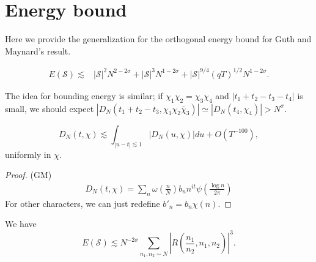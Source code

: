 
\section{Energy bound}
Here we provide the generalization for the orthogonal energy bound for Guth and Maynard's result. 
\begin{proposition}
    \begin{align*}
        E(\mathcal{S})
        \lesssim& |\mathcal{S}|^2N^{2-2\sigma}+ |\mathcal{S}|^3N^{1-2\sigma} + |\mathcal{S}|^{9/4}(qT)^{1/2}N^{{1-2\sigma}}.
    \end{align*}
\end{proposition}
The idea for bounding energy is similar; if $\chi_1\chi_2=\chi_3\chi_4$ and $|t_1+t_2-t_3-t_4|$ is small, we should expect $|D_N(t_1+t_2-t_3,\chi_1\chi_2\bar{\chi}_3)|\simeq |D_N(t_4,\chi_4)|>N^\sigma$.
\begin{lemma}
    \[
    D_N(t,\chi)\lesssim \int_{|u-t|\lesssim 1} |D_N(u,\chi)|du + O(T^{-100}),
    \]
    uniformly in $\chi$.
\end{lemma}
\begin{proof}
    (GM)
    \begin{align*}
        D_N(t,\chi)=\sum_n \omega\left(\frac{n}{N}\right) b_n n^{it} \psi\left(\frac{\log n}{2\pi}\right)
    \end{align*}
    For other characters, we can just redefine $b'_n=b_n\chi(n)$.
\end{proof}
\begin{lemma} We have \[
    E(\mathcal{S})\lesssim N^{-2\sigma}\sum_{n_1,n_2\sim N}\left|R\left(\frac{n_1}{n_2},n_1,n_2\right) \right|^3.
    \]
    
\end{lemma}
